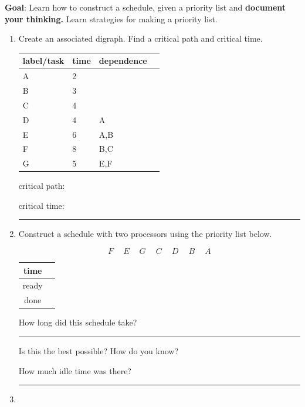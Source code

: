 \documentclass[12pt]{article}
\renewcommand{\emph}[1]{\textsf{\textbf{#1}}}
\newcommand{\ans}[1][1in]{\rule{#1}{.5pt}}
\begin{document}
\emph{Goal}: Learn how to construct a schedule, given a priority list and \emph{document your thinking.} Learn strategies for making a priority list.\\

\begin{enumerate}
\item Create an associated digraph. Find a critical path and critical time.\\

\begin{tabular}{llll}
label/task&time&dependence\\
\hline
A&2&\\
B&3&\\
C&4&\\
D&4&A\\
E&6&A,B\\
F&8&B,C\\
G&5&E,F\\
\end{tabular}

critical path: \hrulefill

critical time: \ans


\item Construct a schedule with two processors using the priority list below. 

$$F \:\quad E \:\quad G \:\quad C \:\quad D \:\quad B \: \quad A$$

\vspace{.1in}


\hspace*{-1in}	\begin{tabular}{c || c}
time &   \quad \hspace{6in} \quad \\ \hline
ready& \\ \hline
done& \\ \hline
\end{tabular}


How long did this schedule take? \ans

Is this the best possible? How do you know? 

\vfill

How much idle time was there? \ans



\vspace{1cm}

\item {}
\vfill

\vfill
\end{enumerate}
\end{document}
